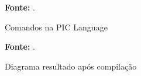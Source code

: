 \begin{figure}[ht!]
\centering

\caption{\textmd{Comandos na PIC Language}}
\label{fig:piclanguage}

\par\medskip\textbf{Fonte:} . \par\medskip
\end{figure}

\begin{figure}[ht!]
\centering

\caption{\textmd{Diagrama resultado após compilação}}
\label{fig:piclanguageresultado}

\par\medskip\textbf{Fonte:} . \par\medskip
\end{figure}